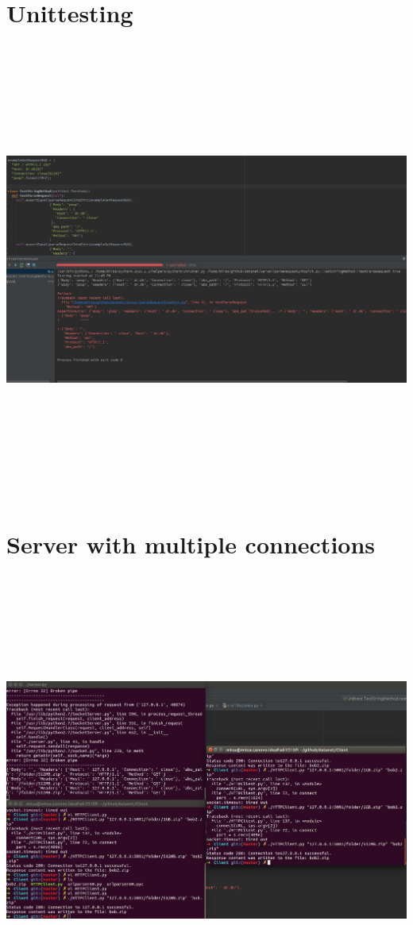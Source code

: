 \documentclass{sig-alternate-05-2015}
\begin{document}
\section{Unittesting}
\includegraphics[height=15cm, width=20cm, angle=90]{Screenshot1.jpg}
\newpage
\section{Server with multiple connections}
\includegraphics[height=15cm, width=20cm, angle=90]{Screenshot2.jpg}
\newpage
\end{document}
